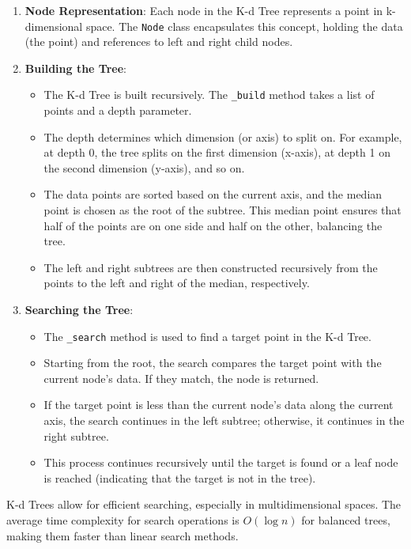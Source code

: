 \documentclass{article}
\begin{document}
	\begin{enumerate}
		\item \textbf{Node Representation}: Each node in the K-d Tree represents a point in k-dimensional space. The \texttt{Node} class encapsulates this concept, holding the data (the point) and references to left and right child nodes.
		
		\item \textbf{Building the Tree}:
		\begin{itemize}
			\item The K-d Tree is built recursively. The \texttt{\_build} method takes a list of points and a depth parameter.
			\item The depth determines which dimension (or axis) to split on. For example, at depth 0, the tree splits on the first dimension (x-axis), at depth 1 on the second dimension (y-axis), and so on.
			\item The data points are sorted based on the current axis, and the median point is chosen as the root of the subtree. This median point ensures that half of the points are on one side and half on the other, balancing the tree.
			\item The left and right subtrees are then constructed recursively from the points to the left and right of the median, respectively.
		\end{itemize}
		
		\newpage
		\item \textbf{Searching the Tree}:
		\begin{itemize}
			\item The \texttt{\_search} method is used to find a target point in the K-d Tree.
			\item Starting from the root, the search compares the target point with the current node's data. If they match, the node is returned.
			\item If the target point is less than the current node's data along the current axis, the search continues in the left subtree; otherwise, it continues in the right subtree.
			\item This process continues recursively until the target is found or a leaf node is reached (indicating that the target is not in the tree).
		\end{itemize}
	\end{enumerate}
	
	 K-d Trees allow for efficient searching, especially in multidimensional spaces. The average time complexity for search operations is \(O(\log n)\) for balanced trees, making them faster than linear search methods.
		
\end{document}
